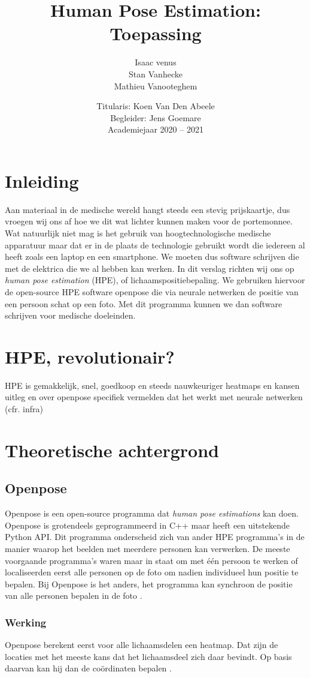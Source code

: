 \documentclass[a4paper,twoside,kulak]{kulakreport}
\title{Human Pose Estimation:\\Toepassing}
\subtitle{}
\author{Isaac venus\\Stan Vanhecke\\Mathieu Vanooteghem}
\institute{KU Leuven Kulak, Wetenschap \& Technologie}
\date{Titularis: Koen Van Den Abeele\\Begleider: Jens Goemare\\Academiejaar 2020 -- 2021}
\begin{document}

\titlepage

\tableofcontents

\chapter*{Inleiding}
Aan materiaal in de medische wereld hangt steeds een stevig prijskaartje, dus vroegen wij ons af hoe we dit wat lichter kunnen maken voor de portemonnee. Wat natuurlijk niet mag is het gebruik van hoogtechnologische medische apparatuur maar dat er in de plaats de technologie gebruikt wordt die iedereen al heeft zoals een laptop en een smartphone. We moeten dus software schrijven die met de elektrica die we al hebben kan werken. In dit verslag richten wij ons op \emph{human pose estimation} (HPE), of lichaamspositiebepaling. We gebruiken hiervoor de open-source HPE software openpose die via neurale netwerken de positie van een persoon schat op een foto. Met dit programma kunnen we dan software schrijven voor medische doeleinden.

\chapter{HPE, revolutionair?}
HPE is gemakkelijk, snel, goedkoop en steeds nauwkeuriger
heatmaps en kansen uitleg en over openpose specifiek
vermelden dat het werkt met neurale netwerken (cfr. infra)

\chapter{Theoretische achtergrond}
\section{Openpose}
Openpose is een open-source programma dat \emph{human pose estimations} kan doen. Openpose is grotendeels geprogrammeerd in C++ maar heeft een uitstekende Python API. Dit programma onderscheid zich van ander HPE programma's in de manier waarop het beelden met meerdere personen kan verwerken. De meeste voorgaande programma's waren maar in staat om met één persoon te werken of localiseerden eerst alle personen op de foto om nadien individueel hun positie te bepalen. Bij Openpose is het anders, het programma kan synchroon de positie van alle personen bepalen in de foto \cite{openpose}.
\subsection{Werking}
Openpose berekent eerst voor alle lichaamsdelen een heatmap. Dat zijn de locaties met het meeste kans dat het lichaamsdeel zich daar bevindt. Op basis daarvan kan hij dan de coördinaten bepalen \cite{heatmaps}.
\end{document}
